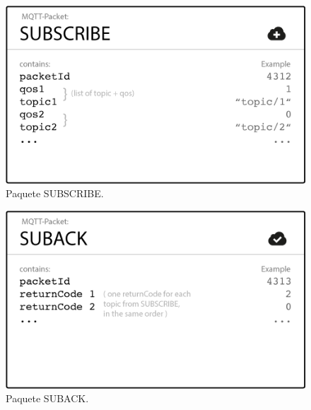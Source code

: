 \documentclass[12pt, twoside]{book}
\begin{document}
\begin{figure}[H]
\centering
\includegraphics[scale=0.3]{images/subscribe_packet.png}
\caption{Paquete SUBSCRIBE.}\label{L404}
\end{figure}
\begin{figure}[H]
\centering
\includegraphics[scale=0.3]{images/suback_packet.png}
\caption{Paquete SUBACK.}\label{L405}
\end{figure}
\end{document}
